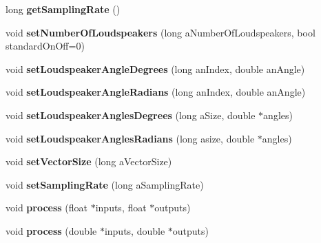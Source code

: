 \begin{DoxyCompactItemize}
\item 
\hypertarget{class_planewaves_a8f8b89eed4f2666735e331b2e1c97851}{long {\bfseries get\-Sampling\-Rate} ()}\label{class_planewaves_a8f8b89eed4f2666735e331b2e1c97851}

\item 
\hypertarget{class_planewaves_a78c8ed28bb96d5847f01922da56317ca}{void {\bfseries set\-Number\-Of\-Loudspeakers} (long a\-Number\-Of\-Loudspeakers, bool standard\-On\-Off=0)}\label{class_planewaves_a78c8ed28bb96d5847f01922da56317ca}

\item 
\hypertarget{class_planewaves_a05a5ba2dd520d3e7492b73f482a2c580}{void {\bfseries set\-Loudspeaker\-Angle\-Degrees} (long an\-Index, double an\-Angle)}\label{class_planewaves_a05a5ba2dd520d3e7492b73f482a2c580}

\item 
\hypertarget{class_planewaves_a365f3bbfb54a46fab37e9fa882405ca8}{void {\bfseries set\-Loudspeaker\-Angle\-Radians} (long an\-Index, double an\-Angle)}\label{class_planewaves_a365f3bbfb54a46fab37e9fa882405ca8}

\item 
\hypertarget{class_planewaves_aa6a30b01e2fb507dd127ab2e1a6fc097}{void {\bfseries set\-Loudspeaker\-Angles\-Degrees} (long a\-Size, double $\ast$angles)}\label{class_planewaves_aa6a30b01e2fb507dd127ab2e1a6fc097}

\item 
\hypertarget{class_planewaves_a7d8c18b07d2f02a4249df54b447fb8ab}{void {\bfseries set\-Loudspeaker\-Angles\-Radians} (long asize, double $\ast$angles)}\label{class_planewaves_a7d8c18b07d2f02a4249df54b447fb8ab}

\item 
\hypertarget{class_planewaves_a8d2a07cd72c21e3b2e722f26a662f34d}{void {\bfseries set\-Vector\-Size} (long a\-Vector\-Size)}\label{class_planewaves_a8d2a07cd72c21e3b2e722f26a662f34d}

\item 
\hypertarget{class_planewaves_ad6f440d73aa29dea36dcfea289be4201}{void {\bfseries set\-Sampling\-Rate} (long a\-Sampling\-Rate)}\label{class_planewaves_ad6f440d73aa29dea36dcfea289be4201}

\item 
\hypertarget{class_planewaves_ac5f48e1a69cbc44d23133bb6bc0bef75}{void {\bfseries process} (float $\ast$inputs, float $\ast$outputs)}\label{class_planewaves_ac5f48e1a69cbc44d23133bb6bc0bef75}

\item 
\hypertarget{class_planewaves_a4e4c760142418f0e6741f728a074e9e8}{void {\bfseries process} (double $\ast$inputs, double $\ast$outputs)}\label{class_planewaves_a4e4c760142418f0e6741f728a074e9e8}


\end{DoxyCompactItemize}

